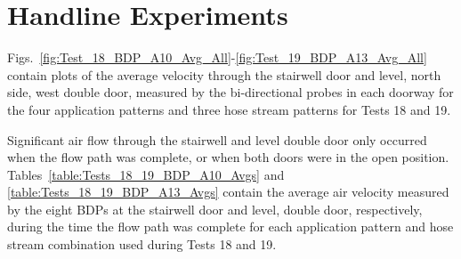 \documentclass[12pt,oneside]{book}
\begin{document}
\section{Handline Experiments}
\label{sec:handline_results}

Figs.~\ref{fig:Test_18_BDP_A10_Avg_All}-\ref{fig:Test_19_BDP_A13_Avg_All} contain plots of the average velocity through the stairwell door and  level, north side, west double door, measured by the bi-directional probes in each doorway for the four application patterns and three hose stream patterns for Tests 18 and 19. 





Significant air flow through the stairwell and  level double door only occurred when the flow path was complete, or when both doors were in the open position. Tables~\ref{table:Tests_18_19_BDP_A10_Avgs} and \ref{table:Tests_18_19_BDP_A13_Avgs} contain the average air velocity measured by the eight BDPs at the stairwell door and  level, double door, respectively, during the time the flow path was complete for each application pattern and hose stream combination used during Tests 18 and 19.
\end{document}
